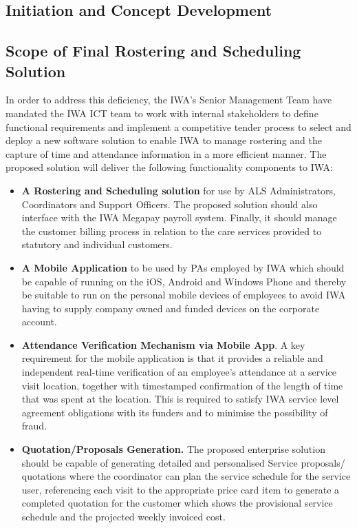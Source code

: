 \documentclass[a4paper,12pt]{article}
\begin{document}
\begin{samepage}
\begin{samepage}
\section {Initiation and Concept Development}

\subsection {Scope of Final Rostering and Scheduling Solution}
In order to address this deficiency, the IWA's Senior Management Team have mandated the IWA ICT team to work with internal stakeholders to define functional requirements and implement a competitive tender process to select and deploy a new software solution to enable IWA to manage rostering and the capture of time and attendance information in a more efficient manner.
The proposed solution will deliver the following functionality components to IWA:
\begin{itemize}
\item \textbf{A Rostering and Scheduling solution} for use by ALS Administrators, Coordinators and Support Officers. The proposed solution should also interface with the IWA Megapay payroll system. Finally, it should manage the customer billing process in relation to the care services provided to statutory and individual customers.
\item \textbf {A Mobile Application} to be used by PAs employed by IWA which should be capable of running on the iOS, Android and Windows Phone and thereby be suitable to run on the personal mobile devices of employees to avoid IWA having to supply company owned and funded devices on the corporate account. 
\item \textbf {Attendance Verification Mechanism via Mobile App}. A key requirement for the mobile application is that it provides a reliable and independent real-time verification of an employee’s attendance at a service visit location, together with timestamped confirmation of the length of time that was spent at the location.  This is required to satisfy IWA service level agreement obligations with its funders and to minimise the possibility of fraud.
\pagebreak
\item\textbf {Quotation/Proposals Generation.} The proposed enterprise solution should be capable of generating detailed and personalised Service proposals/ quotations where the coordinator can plan the service schedule for the service user, referencing each visit to the appropriate price card item to generate a completed quotation for the customer which shows the provisional service schedule and the projected weekly invoiced cost.

\end{itemize}
\end{samepage}
\end{samepage}
\end{document}
